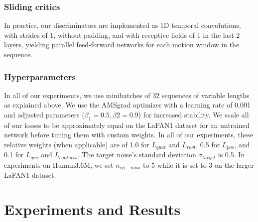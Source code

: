\documentclass[acmtog]{acmart}
\begin{document}
\subsubsection{Sliding critics}
In practice, our discriminators are implemented as 1D temporal convolutions, with strides of 1, without padding, and with receptive fields of 1 in the last 2 layers, yielding parallel feed-forward networks for each motion window in the sequence.

\subsubsection{Hyperparameters} In all of our experiments, we use minibatches of 32 sequences of variable lengths as explained above. We use the AMSgrad optimizer \cite{sashank2018amsgrad} with a learning rate of 0.001 and adjusted parameters ($\beta_1 = 0.5, \beta2 = 0.9$) for increased stability. We scale all of our losses to be approximately equal on the LaFAN1 dataset for an untrained network before tuning them with custom weights. In all of our experiments, these relative weights (when applicable) are of 1.0 for $L_{\mathit{quat}}$ and $L_{\mathit{root}}$, 0.5 for $L_{\mathit{pos}}$, and 0.1 for $L_{\mathit{gen}}$ and $L_{\mathit{contacts}}$. The target noise's standard deviation $\sigma_{\mathit{target}}$ is 0.5. In experiments on Human3.6M, we set $n_{\mathit{ep-max}}$ to 5 while it is set to 3 on the larger LaFAN1 dataset. 

\section{Experiments and Results} \label{sec:results}
\end{document}
